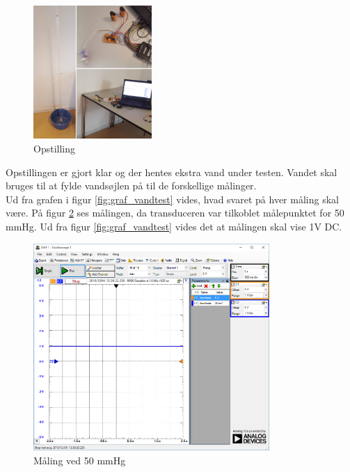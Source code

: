 \begin{figure}[H]
	\centering
	\includegraphics[width=0.4\textwidth]{Figurer/vandtest_opstilling}
	\caption{Opstilling}
	\label{fig:vandtest_opstilling}
\end{figure} 
Opstillingen er gjort klar og der hentes ekstra vand under testen. Vandet skal bruges til at fylde vandsøjlen på til de forskellige målinger. \\
Ud fra grafen i figur \ref{fig:graf_vandtest} vides, hvad svaret på hver måling skal være. På figur \ref{fig:vandtest_måling50} ses målingen, da transduceren var tilkoblet målepunktet for 50 mmHg. Ud fra figur \ref{fig:graf_vandtest} vides det at målingen skal vise 1V DC.  
\begin{figure}[H]
	\centering	\includegraphics[width=0.8\textwidth]{Figurer/50mmhg}
	\caption{Måling ved 50 mmHg}
	\label{fig:vandtest_måling50}
\end{figure}

